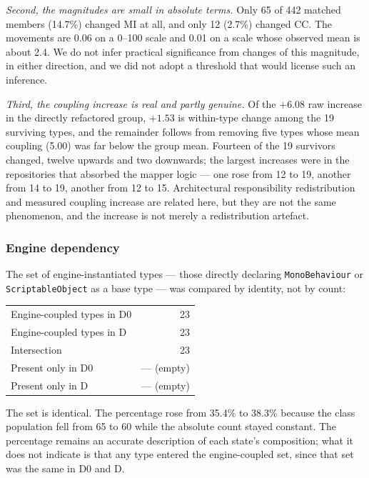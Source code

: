 \documentclass{sbc2019}%
\begin{document}
\emph{Second, the magnitudes are small in absolute terms.} Only 65 of 442 matched
members (14.7\%) changed MI at all, and only 12 (2.7\%) changed CC\@. The movements
are 0.06 on a 0--100 scale and 0.01 on a scale whose observed mean is about 2.4.
We do not infer practical significance from changes of this magnitude, in either
direction, and we did not adopt a threshold that would license such an
inference.

\emph{Third, the coupling increase is real and partly genuine.} Of the $+6.08$
raw increase in the directly refactored group, $+1.53$ is within-type change
among the 19 surviving types, and the remainder follows from removing five types
whose mean coupling (5.00) was far below the group mean. Fourteen of the 19
survivors changed, twelve upwards and two downwards; the largest increases were
in the repositories that absorbed the mapper logic --- one rose from 12 to 19,
another from 14 to 19, another from 12 to 15. Architectural responsibility
redistribution and measured coupling increase are related here, but they are not
the same phenomenon, and the increase is not merely a redistribution artefact.

\subsubsection{Engine dependency}

The set of engine-instantiated types --- those directly declaring
\texttt{MonoBehaviour} or \texttt{ScriptableObject} as a base type --- was
compared by identity, not by count:

\begin{center}\small
\begin{tabular}{lr}
Engine-coupled types in D0 & 23 \\
Engine-coupled types in D  & 23 \\
Intersection               & 23 \\
Present only in D0         & --- (empty) \\
Present only in D          & --- (empty) \\
\end{tabular}
\end{center}

The set is identical. The percentage rose from 35.4\% to 38.3\% because the
class population fell from 65 to 60 while the absolute count stayed constant.
The percentage remains an accurate description of each state's composition; what
it does not indicate is that any type entered the engine-coupled set, since that
set was the same in D0 and D.
\end{document}
